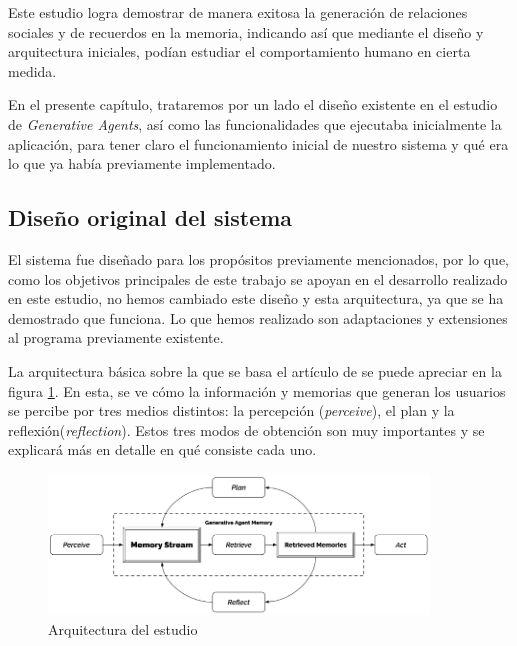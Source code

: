 Este estudio logra demostrar de manera exitosa la generación de relaciones sociales y de recuerdos en la memoria, indicando así que mediante el diseño y arquitectura iniciales, podían estudiar el comportamiento humano en cierta medida.

En el presente capítulo, trataremos por un lado el diseño existente en el estudio de \textit{Generative Agents}, así como las funcionalidades que ejecutaba inicialmente la aplicación, para tener claro el funcionamiento inicial de nuestro sistema y qué era lo que ya había previamente implementado.

\subsection{Diseño original del sistema}
El sistema fue diseñado para los propósitos previamente mencionados, por lo que, como los objetivos principales de este trabajo se apoyan en el desarrollo realizado en este estudio, no hemos cambiado este diseño y esta arquitectura, ya que se ha demostrado que funciona. Lo que hemos realizado son adaptaciones y extensiones al programa previamente existente.

La arquitectura básica sobre la que se basa el artículo de \ga se puede apreciar en la figura \ref{fig:arquitecturaGenAgents}. En esta, se ve cómo la información y memorias que generan los usuarios se percibe por tres medios distintos: la percepción (\textit{perceive}), el plan y la reflexión(\textit{reflection}). Estos tres modos de obtención son muy importantes y se explicará más en detalle en qué consiste cada uno.

\begin{figure}[H]
	\centering
	\includegraphics[width = 0.9\textwidth]{Imagenes/Vectorial/arquitecturaGenAgents.png}
	\caption{Arquitectura del estudio \ga \citep{park2023generative}}
	\label{fig:arquitecturaGenAgents}
\end{figure}

